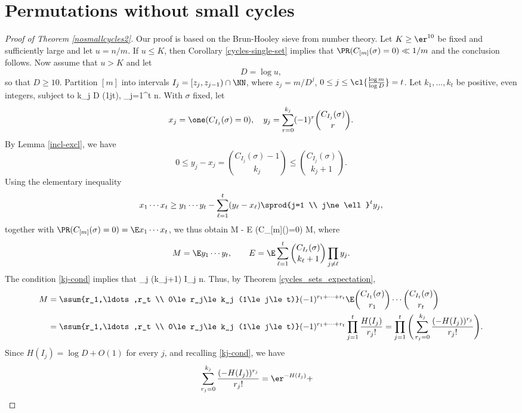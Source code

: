 \section{Permutations without small cycles}\label{sec:nosmall}
%
%


\begin{proof}[Proof of Theorem \ref{nosmallcycles2}]
Our proof is based on the Brun-Hooley sieve \cite{BrunHooley}
from number theory.
Let $K \ge \er^{10}$ be fixed and sufficiently large and let $u=n/m$.  If $u \le K$, then
Corollary \ref{cycles-single-set} implies that $\PR(C_{[m]}(\sigma)=0)\ll 1/m$ and 
the conclusion follows.  Now assume that $u > K$ and let 
\[
D = \log u,
\]
so that $D\ge 10$.
Partition $[m]$ into intervals $I_j=[z_j,z_{j-1})\cap \NN$, where $z_j=m/D^j$,
$0\le j\le \cl{\frac{\log m}{\log D}}=t$. 
Let $k_1,\ldots,k_t$ be positive, even integers, subject to
\be\label{kj-cond}
k_j \log D \;\; (1\le j\le t), \qquad \sum_{j=1}^t  \le n.
\ee
With $\sigma$ fixed, let
\[
x_j = \one(C_{I_j}(\sigma)=0), \quad y_j = \sum_{r=0}^{k_j} (-1)^r \binom{C_{I_j}(\sigma)}{r}.
\]
By Lemma  \ref{incl-excl}, we have
\[
0\le y_j - x_j = \binom{C_{I_j}(\sigma)-1}{k_j} \le \binom{C_{I_j}(\sigma)}{k_j+1}.
\]
Using the elementary inequality
 \[
x_1\cdots x_t \ge y_1\cdots y_t - \sum_{\ell=1}^t (y_\ell-x_\ell) \sprod{j=1 \\ j\ne \ell}^t y_j,  
 \]
 together with $\PR(C_{[m]}(\sigma)=0) =  \E x_1\cdots x_t$, we thus obtain
\be\label{small-ME}
M - E \le \PR(C_{[m]}(\sigma)=0) \le M,
\ee
where
\[
M=\E y_1\cdots y_t, \qquad E = \E \sum_{\ell=1}^t \binom{C_{I_\ell}(\sigma)}{k_\ell+1} \prod_{j\ne \ell} y_j.
\]
The condition \eqref{kj-cond} implies that 
\be\label{kjmaxIj-2}
\sum_j (k_j+1) \max I_j \le n.
\ee
  Thus, by
Theorem \ref{cycles_sets_expectation},
\begin{align*}
M &= \ssum{r_1,\ldots,r_t \\ 0\le r_j\le k_j (1\le j\le t)} 
(-1)^{r_1+\cdots+r_t} \E \binom{C_{I_1}(\sigma)}{r_1} \cdots \binom{C_{I_t}(\sigma)}{r_t} \\
&=  \ssum{r_1,\ldots,r_t \\ 0\le r_j\le k_j (1\le j\le t)} 
(-1)^{r_1+\cdots+r_t} \prod_{j=1}^t \frac{H(I_j)}{r_j!} 
= \prod_{j=1}^t \Bigg( \sum_{r_j=0}^{k_j} \frac{(-H(I_j))^{r_j}}{r_j!}    \Bigg).
\end{align*}
Since $H(I_j)=\log D+O(1)$ for every $j$, 
and recalling \eqref{kj-cond}, we have 
\begin{align}
\sum_{r_j=0}^{k_j} \frac{(-H(I_j))^{r_j}}{r_j!} &= \er^{-H(I_j)} +

\end{align}
\end{proof}

